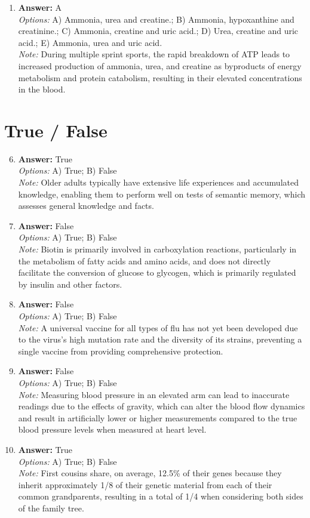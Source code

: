 \documentclass[12pt]{article}
\begin{document}
\begin{enumerate}[label=\arabic*.]
\item \textbf{Answer:} A
\\ \textit{Options:} A) Ammonia, urea and creatine.; B) Ammonia, hypoxanthine and creatinine.; C) Ammonia, creatine and uric acid.; D) Urea, creatine and uric acid.; E) Ammonia, urea and uric acid.
\\ \textit{Note:} During multiple sprint sports, the rapid breakdown of ATP leads to increased production of ammonia, urea, and creatine as byproducts of energy metabolism and protein catabolism, resulting in their elevated concentrations in the blood.
\end{enumerate}

\section*{True / False}
\begin{enumerate}[label=\arabic*.]
\setcounter{enumi}{5}
\item \textbf{Answer:} True
\\ \textit{Options:} A) True; B) False
\\ \textit{Note:} Older adults typically have extensive life experiences and accumulated knowledge, enabling them to perform well on tests of semantic memory, which assesses general knowledge and facts.
\item \textbf{Answer:} False
\\ \textit{Options:} A) True; B) False
\\ \textit{Note:} Biotin is primarily involved in carboxylation reactions, particularly in the metabolism of fatty acids and amino acids, and does not directly facilitate the conversion of glucose to glycogen, which is primarily regulated by insulin and other factors.
\item \textbf{Answer:} False
\\ \textit{Options:} A) True; B) False
\\ \textit{Note:} A universal vaccine for all types of flu has not yet been developed due to the virus's high mutation rate and the diversity of its strains, preventing a single vaccine from providing comprehensive protection.
\item \textbf{Answer:} False
\\ \textit{Options:} A) True; B) False
\\ \textit{Note:} Measuring blood pressure in an elevated arm can lead to inaccurate readings due to the effects of gravity, which can alter the blood flow dynamics and result in artificially lower or higher measurements compared to the true blood pressure levels when measured at heart level.
\item \textbf{Answer:} True
\\ \textit{Options:} A) True; B) False
\\ \textit{Note:} First cousins share, on average, 12.5\% of their genes because they inherit approximately 1/8 of their genetic material from each of their common grandparents, resulting in a total of 1/4 when considering both sides of the family tree.
\end{enumerate}
\end{document}
